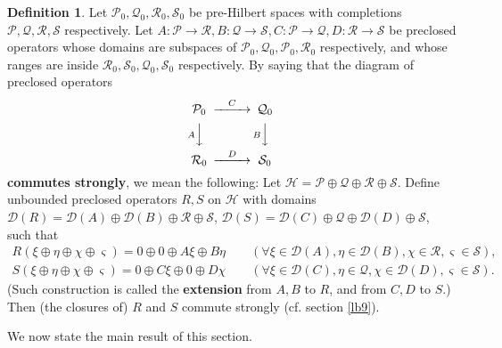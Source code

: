 \documentclass[12pt,a4paper]{article}
\theoremstyle{definition}
\newtheorem{df}{Definition}[subsection]
\theoremstyle{plain}
\newcommand{\mc}{\mathcal}
\newcommand{\Dom}{\scr D}
\newcommand{\scr}{\mathscr}
\numberwithin{equation}{subsection}
\begin{document}
\begin{df}\label{lb77}
	Let $\mc P_0,\mc Q_0, \mc R_0,\mc S_0$ be pre-Hilbert spaces with completions $\mc P,\mc Q,\mc R,\mc S$ respectively. Let  $A:\mc P\rightarrow\mc R,B:\mc Q\rightarrow\mc S,C:\mc P\rightarrow\mc Q,D:\mc R\rightarrow\mc S$ be preclosed operators whose domains are subspaces of $\mc P_0,\mc Q_0, \mc P_0,\mc R_0$ respectively, and whose ranges are inside $\mc R_0,\mc S_0,\mc Q_0,\mc S_0$ respectively. By saying that the diagram of preclosed operators
	\begin{align}
	\begin{CD}
	\mc P_0 @>C>> \mc Q_0\\
	@V A VV @V B VV\\
	\mc R_0 @>D>> \mc S_0
	\end{CD}
	\end{align}
	\textbf{commutes strongly}, we mean the following: Let $\mc H=\mc P\oplus\mc Q\oplus\mc R\oplus\mc S$. Define unbounded preclosed operators $R,S$ on $\mc H$ with domains $\Dom(R)=\Dom(A)\oplus\Dom(B)\oplus\mc R\oplus \mc S$, $\Dom(S)=\Dom(C)\oplus\mc Q\oplus\Dom(D)\oplus \mc S$, such that
	\begin{gather*}
	R(\xi\oplus\eta\oplus\chi\oplus\varsigma)=0\oplus 0\oplus A\xi\oplus B\eta\qquad(\forall \xi\in\Dom(A),\eta\in\Dom(B),\chi\in\mc R,\varsigma\in \mc S),\\
	S(\xi\oplus\eta\oplus\chi\oplus\varsigma)=0\oplus C\xi\oplus 0\oplus D\chi   \qquad(\forall \xi\in\Dom(C),\eta\in\mc Q,\chi\in \Dom(D),\varsigma\in\mc S).
	\end{gather*}
	(Such construction is called the \textbf{extension} from $A,B$ to $R$, and from $C,D$ to $S$.) Then (the closures of) $R$ and $S$ commute strongly (cf. section \ref{lb9}).
\end{df} 


We now state the main result of this section.
\end{document}
